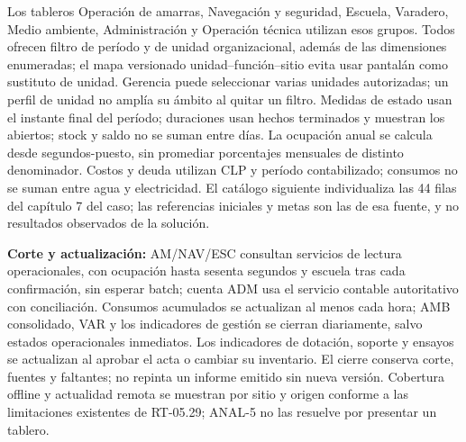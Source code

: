 Los tableros Operación de amarras, Navegación y seguridad, Escuela, Varadero, Medio ambiente, Administración y Operación técnica utilizan esos grupos. Todos ofrecen filtro de período y de unidad organizacional, además de las dimensiones enumeradas; el mapa versionado unidad--función--sitio evita usar pantalán como sustituto de unidad. Gerencia puede seleccionar varias unidades autorizadas; un perfil de unidad no amplía su ámbito al quitar un filtro. Medidas de estado usan el instante final del período; duraciones usan hechos terminados y muestran los abiertos; stock y saldo no se suman entre días. La ocupación anual se calcula desde segundos-puesto, sin promediar porcentajes mensuales de distinto denominador. Costos y deuda utilizan CLP y período contabilizado; consumos no se suman entre agua y electricidad. El catálogo siguiente individualiza las 44 filas del capítulo 7 del caso; las referencias iniciales y metas son las de esa fuente, y no resultados observados de la solución.



\textbf{Corte y actualización:} AM/NAV/ESC consultan servicios de lectura operacionales, con ocupación hasta sesenta segundos y escuela tras cada confirmación, sin esperar batch; cuenta ADM usa el servicio contable autoritativo con conciliación. Consumos acumulados se actualizan al menos cada hora; AMB consolidado, VAR y los indicadores de gestión se cierran diariamente, salvo estados operacionales inmediatos. Los indicadores de dotación, soporte y ensayos se actualizan al aprobar el acta o cambiar su inventario. El cierre conserva corte, fuentes y faltantes; no repinta un informe emitido sin nueva versión. Cobertura offline y actualidad remota se muestran por sitio y origen conforme a las limitaciones existentes de RT-05.29; ANAL-5 no las resuelve por presentar un tablero.

